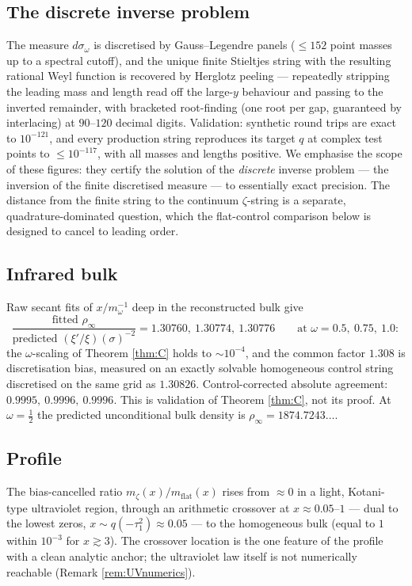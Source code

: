 \documentclass[11pt,reqno]{amsart}
\theoremstyle{plain}
\theoremstyle{definition}
\begin{document}
\subsection{The discrete inverse problem}
The measure $d\sigma_\omega$ is discretised by Gauss--Legendre panels ($\le152$ point masses up
to a spectral cutoff), and the unique finite Stieltjes string with the resulting rational Weyl
function is recovered by Herglotz peeling --- repeatedly stripping the leading mass and length
read off the large-$y$ behaviour and passing to the inverted remainder, with bracketed
root-finding (one root per gap, guaranteed by interlacing) at $90$--$120$ decimal digits.
Validation: synthetic round trips are exact to $10^{-121}$, and every production string
reproduces its target $q$ at complex test points to $\le10^{-117}$, with all masses and lengths
positive. We emphasise the scope of these figures: they certify the solution of the
\emph{discrete} inverse problem --- the inversion of the finite discretised measure --- to
essentially exact precision. The distance from the finite string to the continuum
$\zeta$-string is a separate, quadrature-dominated question, which the flat-control comparison
below is designed to cancel to leading order.

\subsection{Infrared bulk}
Raw secant fits of $x/m_\omega^{-1}$ deep in the reconstructed bulk give
\[
  \frac{\text{fitted }\rho_\infty}{\text{predicted }(\xi'/\xi)(\sigma)^{-2}}
  =1.30760,\ 1.30774,\ 1.30776
  \qquad\text{at }\omega=0.5,\ 0.75,\ 1.0 :
\]
the $\omega$-scaling of Theorem \ref{thm:C} holds to $\sim10^{-4}$, and the common factor
$1.308$ is discretisation bias, measured on an exactly solvable homogeneous control string
discretised on the same grid as $1.30826$. Control-corrected absolute agreement:
$0.9995,\ 0.9996,\ 0.9996$. This is validation of Theorem \ref{thm:C}, not its proof.
At $\omega=\tfrac12$ the predicted unconditional bulk density is
$\rho_\infty=1874.7243\ldots$.

\subsection{Profile}
The bias-cancelled ratio $m_\zeta(x)/m_{\mathrm{flat}}(x)$ rises from $\approx0$ in a light,
Kotani-type ultraviolet region, through an arithmetic crossover at $x\approx0.05$--$1$ --- dual
to the lowest zeros, $x\sim q(-\tau_1^2)\approx0.05$ --- to the homogeneous bulk (equal to $1$
within $10^{-3}$ for $x\gtrsim3$). The crossover location is the one feature of the profile
with a clean analytic anchor; the ultraviolet law itself is not numerically reachable
(Remark \ref{rem:UVnumerics}).
\end{document}
